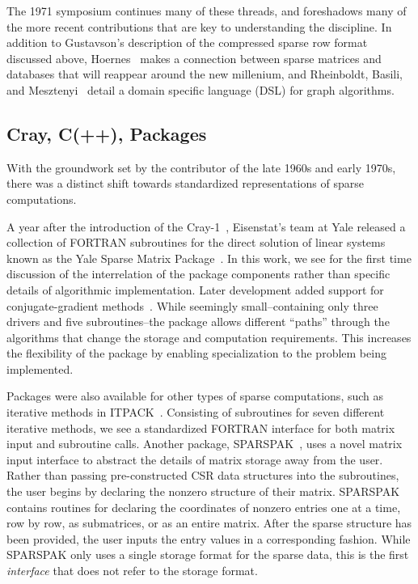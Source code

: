 The 1971 symposium continues many of these threads, and foreshadows many of the more recent contributions that are key to understanding the discipline.
In addition to Gustavson's description of the compressed sparse row format discussed above, Hoernes~\cite{hoernes1972generalized} makes a connection between sparse matrices and databases that will reappear around the new millenium, and Rheinboldt, Basili, and Mesztenyi~\cite{rheinboldt1972graal} detail a domain specific language (DSL) for graph algorithms.


\subsection{Cray, C(++), Packages}

With the groundwork set by the contributor of the late 1960s and early 1970s, there was a distinct shift towards standardized representations of sparse computations. 

A year after the introduction of the Cray-1~\cite{normand2010first}, Eisenstat's team at Yale released a collection of FORTRAN subroutines for the direct solution of linear systems known as the Yale Sparse Matrix Package~\cite{eisenstat1977yale,eisenstat1977yale2}.
In this work, we see for the first time discussion of the interrelation of the package components rather than specific details of algorithmic implementation.
Later development added support for conjugate-gradient methods~\cite{eisenstat1984new}. 
While seemingly small--containing only three drivers and five subroutines--the package allows different \enquote{paths} through the algorithms that change the storage and computation requirements. 
This increases the flexibility of the package by enabling specialization to the problem being implemented.

Packages were also available for other types of sparse computations, such as iterative methods in ITPACK~\cite{kincaid1982algorithm}.
Consisting of subroutines for seven different iterative methods, we see a standardized FORTRAN interface for both matrix input and subroutine calls. 
Another package, SPARSPAK~\cite{chu1980user,george1984new}, uses a novel matrix input interface to abstract the details of matrix storage away from the user.
Rather than passing pre-constructed CSR data structures into the subroutines, the user begins by declaring the nonzero structure of their matrix. 
SPARSPAK contains routines for declaring the coordinates of nonzero entries one at a time, row by row, as submatrices, or as an entire matrix.
After the sparse structure has been provided, the user inputs the entry values in a corresponding fashion. 
While SPARSPAK only uses a single storage format for the sparse data, this is the first \textit{interface} that does not refer to the storage format.

